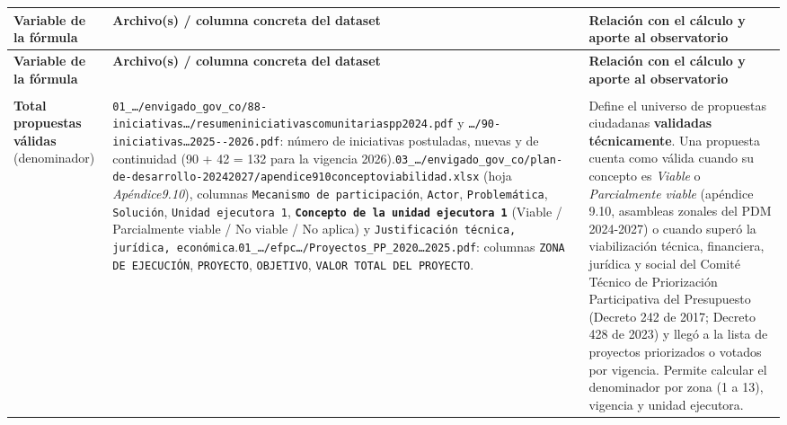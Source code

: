\documentclass[11pt,a4paper]{article}
\begin{document}
{\footnotesize
\setlength{\tabcolsep}{3pt}
\begin{longtable}{>{\raggedright\arraybackslash}p{0.18\dimexpr\linewidth-6\tabcolsep\relax}>{\raggedright\arraybackslash}p{0.42\dimexpr\linewidth-6\tabcolsep\relax}>{\raggedright\arraybackslash}p{0.40\dimexpr\linewidth-6\tabcolsep\relax}}
\toprule
\textbf{Variable de la fórmula} & \textbf{Archivo(s) / columna concreta del dataset} & \textbf{Relación con el cálculo y aporte al observatorio} \\
\midrule
\endfirsthead
\toprule
\textbf{Variable de la fórmula} & \textbf{Archivo(s) / columna concreta del dataset} & \textbf{Relación con el cálculo y aporte al observatorio} \\
\midrule
\endhead
\midrule
\multicolumn{3}{r}{\emph{Continúa en la página siguiente}} \\
\endfoot
\bottomrule
\endlastfoot
\textbf{Total propuestas válidas} (denominador) & \texttt{01\_\allowbreak{}\ldots{}/\allowbreak{}envigado\_\allowbreak{}gov\_\allowbreak{}co/\allowbreak{}88-\allowbreak{}iniciativas\ldots{}/\allowbreak{}resumeniniciativascomunitariaspp2024.\allowbreak{}pdf} y \texttt{\ldots{}/\allowbreak{}90-\allowbreak{}iniciativas\ldots{}2025-\allowbreak{}-\allowbreak{}2026.\allowbreak{}pdf}: número de iniciativas postuladas, nuevas y de continuidad (90 + 42 = 132 para la vigencia 2026).\newline \texttt{03\_\allowbreak{}\ldots{}/\allowbreak{}envigado\_\allowbreak{}gov\_\allowbreak{}co/\allowbreak{}plan-\allowbreak{}de-\allowbreak{}desarrollo-\allowbreak{}20242027/\allowbreak{}apendice910conceptoviabilidad.\allowbreak{}xlsx} (hoja \emph{Apéndice9.10}), columnas \texttt{Mecanismo de participación}, \texttt{Actor}, \texttt{Problemática}, \texttt{Solución}, \texttt{Unidad ejecutora 1}, \textbf{\texttt{Concepto de la unidad ejecutora 1}} (Viable / Parcialmente viable / No viable / No aplica) y \texttt{Justificación técnica, jurídica, económica}.\newline \texttt{01\_\allowbreak{}\ldots{}/\allowbreak{}efpc\ldots{}/\allowbreak{}Proyectos\_\allowbreak{}PP\_\allowbreak{}2020\ldots{}2025.\allowbreak{}pdf}: columnas \texttt{ZONA DE EJECUCIÓN}, \texttt{PROYECTO}, \texttt{OBJETIVO}, \texttt{VALOR TOTAL DEL PROYECTO}. & Define el universo de propuestas ciudadanas \textbf{validadas técnicamente}. Una propuesta cuenta como válida cuando su concepto es \emph{Viable} o \emph{Parcialmente viable} (apéndice 9.10, asambleas zonales del PDM 2024-2027) o cuando superó la viabilización técnica, financiera, jurídica y social del Comité Técnico de Priorización Participativa del Presupuesto (Decreto 242 de 2017; Decreto 428 de 2023) y llegó a la lista de proyectos priorizados o votados por vigencia. Permite calcular el denominador por zona (1 a 13), vigencia y unidad ejecutora. \\

\end{longtable}}
\end{document}
